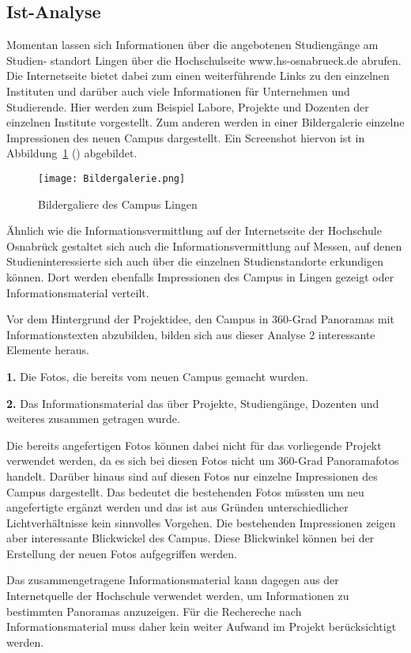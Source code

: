 \subsection{Ist-Analyse}
\label{sec:IstAnalyse}

Momentan lassen sich Informationen über die angebotenen Studiengänge am Studien-
standort Lingen über die Hochschulseite www.hs-osnabrueck.de abrufen. Die Internetseite bietet dabei zum einen 
weiterführende Links zu den einzelnen Instituten und darüber auch viele Informationen für Unternehmen und Studierende.
Hier werden zum Beispiel Labore, Projekte und Dozenten der einzelnen Institute vorgestellt. Zum anderen werden in einer 
Bildergalerie einzelne Impressionen des neuen Campus dargestellt. Ein Screenshot hiervon ist in Abbildung~\ref{fig:Bildergalerie} () abgebildet.

\begin{figure}[htb]
\centering
\texttt{[image: Bildergalerie.png]}
\caption[Bildergalerie des Campus Lingen]{Bildergaliere des Campus Lingen\protect\footnotemark}
\label{fig:Bildergalerie}
\end{figure}

Ähnlich wie die Informationsvermittlung auf der Internetseite der Hochschule Osnabrück
gestaltet sich auch die Informationsvermittlung auf Messen, auf denen Studieninteressierte
sich auch über die einzelnen Studienstandorte erkundigen können. Dort werden ebenfalls
Impressionen des Campus in Lingen gezeigt oder Informationsmaterial verteilt.

Vor dem Hintergrund der Projektidee, den Campus in 360-Grad Panoramas mit Informationstexten abzubilden, bilden sich aus 
dieser Analyse 2 interessante Elemente heraus.

\textbf{1.} Die Fotos, die bereits vom neuen Campus gemacht wurden.

\textbf{2.} Das Informationsmaterial das über Projekte, Studiengänge, Dozenten und weiteres zusammen getragen wurde.

Die bereits angefertigen Fotos können dabei nicht für das vorliegende Projekt verwendet werden, da es sich bei diesen 
Fotos nicht um 360-Grad Panoramafotos handelt. Darüber hinaus sind auf diesen Fotos nur einzelne Impressionen des Campus 
dargestellt. Das bedeutet die bestehenden Fotos müssten um neu angefertigte ergänzt werden und das ist aus Gründen 
unterschiedlicher Lichtverhältnisse kein sinnvolles Vorgehen. Die bestehenden Impressionen zeigen aber
interessante Blickwickel des Campus. Diese Blickwinkel können bei der Erstellung der neuen Fotos aufgegriffen werden. 

Das zusammengetragene Informationsmaterial kann dagegen aus der Internetquelle der Hochschule verwendet werden, um 
Informationen zu bestimmten Panoramas anzuzeigen. Für die Rechereche nach Informationsmaterial muss daher kein weiter 
Aufwand im Projekt berücksichtigt werden.